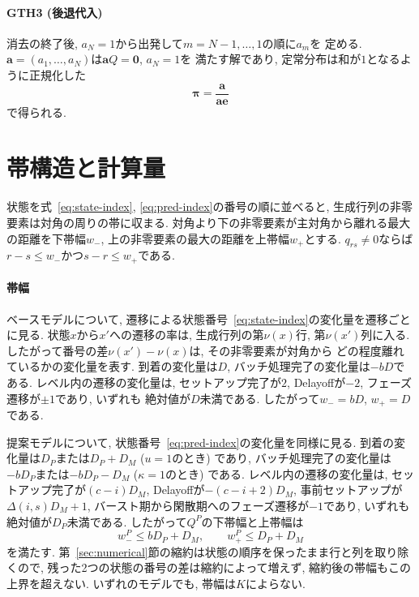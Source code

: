 \documentclass[a4paper, 11pt, dvipdfmx]{jsreport}
\begin{document}
\paragraph{GTH3 (後退代入)}
消去の終了後, $a_N = 1$から出発して$m = N-1, \ldots, 1$の順に$a_m$を
定める. $\bm{a} = (a_1, \ldots, a_N)$は$\bm{a} Q = \bm{0}$, $a_N = 1$を
満たす解であり, 定常分布は和が$1$となるように正規化した
\begin{equation}
    \bm{\pi} = \frac{\bm{a}}{\bm{a}\bm{e}}
    \label{eq:gth-normalize}
\end{equation}
で得られる.



\section{帯構造と計算量}
\label{sec:band}

状態を式~\eqref{eq:state-index}, \eqref{eq:pred-index}の番号の順に並べると,
生成行列の非零要素は対角の周りの帯に収まる. 対角より下の非零要素が主対角から離れる最大の距離を下帯幅$w_-$,
上の非零要素の最大の距離を上帯幅$w_+$とする. $q_{rs} \ne 0$ならば$r - s \le w_-$かつ$s - r \le w_+$である.

\paragraph{帯幅}
ベースモデルについて, 遷移による状態番号~\eqref{eq:state-index}の変化量を遷移ごとに見る.
状態$x$から$x'$への遷移の率は, 生成行列の第$\nu(x)$行, 第$\nu(x')$列に入る.
したがって番号の差$\nu(x') - \nu(x)$は, その非零要素が対角から
どの程度離れているかの変化量を表す.
到着の変化量は$D$, バッチ処理完了の変化量は$-bD$である. レベル内の遷移の変化量は,
セットアップ完了が$2$, Delayoffが$-2$, フェーズ遷移が$\pm 1$であり, いずれも
絶対値が$D$未満である. したがって$w_- = bD$, $w_+ = D$である.

提案モデルについて, 状態番号~\eqref{eq:pred-index}の変化量を同様に見る.
到着の変化量は$D_P$または$D_P + D_M$ ($u = 1$のとき) であり,
バッチ処理完了の変化量は$-b D_P$または$-b D_P - D_M$ ($\kappa = 1$のとき) である.
レベル内の遷移の変化量は, セットアップ完了が$(c-i) D_M$,
Delayoffが$-(c-i+2) D_M$, 事前セットアップが$\Delta(i, s) D_M + 1$,
バースト期から閑散期へのフェーズ遷移が$-1$であり, いずれも絶対値が$D_P$未満である.
したがって$Q^{P}$の下帯幅と上帯幅は
\begin{equation}
    w_-^{P} \le b D_P + D_M, \qquad w_+^{P} \le D_P + D_M
    \label{eq:pred-band}
\end{equation}
を満たす. 第~\ref{sec:numerical}節の縮約は状態の順序を保ったまま行と列を取り除くので,
残った2つの状態の番号の差は縮約によって増えず, 縮約後の帯幅もこの上界を超えない.
いずれのモデルでも, 帯幅は$K$によらない.
\end{document}

